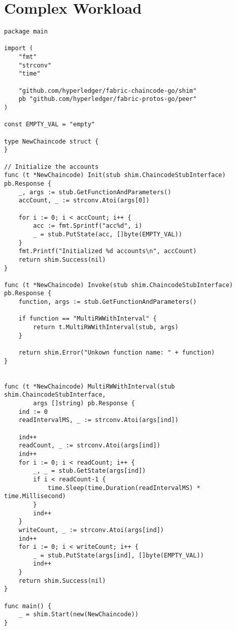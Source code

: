 \section{Complex Workload}
\label{ch:append:contracts:complex}
\begin{lstlisting}
package main

import (
	"fmt"
	"strconv"
	"time"

	"github.com/hyperledger/fabric-chaincode-go/shim"
	pb "github.com/hyperledger/fabric-protos-go/peer"
)

const EMPTY_VAL = "empty"

type NewChaincode struct {
}

// Initialize the accounts
func (t *NewChaincode) Init(stub shim.ChaincodeStubInterface) pb.Response {
	_, args := stub.GetFunctionAndParameters()
	accCount, _ := strconv.Atoi(args[0])

	for i := 0; i < accCount; i++ {
		acc := fmt.Sprintf("acc%d", i)
		_ = stub.PutState(acc, []byte(EMPTY_VAL))
	}
	fmt.Printf("Initialized %d accounts\n", accCount)
	return shim.Success(nil)
}

func (t *NewChaincode) Invoke(stub shim.ChaincodeStubInterface) pb.Response {
	function, args := stub.GetFunctionAndParameters()

	if function == "MultiRWWithInterval" {
		return t.MultiRWWithInterval(stub, args)
	}

	return shim.Error("Unkown function name: " + function)
}


func (t *NewChaincode) MultiRWWithInterval(stub shim.ChaincodeStubInterface, 
		args []string) pb.Response {
	ind := 0
	readIntervalMS, _ := strconv.Atoi(args[ind])

	ind++
	readCount, _ := strconv.Atoi(args[ind])	
	ind++
	for i := 0; i < readCount; i++ {
		_, _ = stub.GetState(args[ind])
		if i < readCount-1 {
			time.Sleep(time.Duration(readIntervalMS) * time.Millisecond)
		}
		ind++
	}
	writeCount, _ := strconv.Atoi(args[ind])	
	ind++
	for i := 0; i < writeCount; i++ {
		_ = stub.PutState(args[ind], []byte(EMPTY_VAL))
		ind++
	}
	return shim.Success(nil)
}

func main() {
	_ = shim.Start(new(NewChaincode))
}

\end{lstlisting}